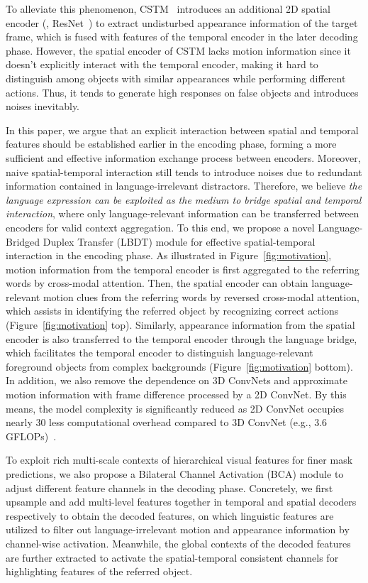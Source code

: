 \documentclass[10pt,twocolumn,letterpaper]{article}
\begin{document}
To alleviate this phenomenon, CSTM~\cite{HuiH0DLWH021} introduces an additional 2D spatial encoder (\eg, ResNet~\cite{He2016CVPR}) to extract undisturbed appearance information of the target frame, which is fused with features of the temporal encoder in the later decoding phase.
However, the spatial encoder of CSTM lacks motion information since it doesn't explicitly interact with the temporal encoder, making it hard to distinguish among objects with similar appearances while performing different actions.
Thus, it tends to generate high responses on false objects and introduces noises inevitably.

In this paper, we argue that an explicit interaction between spatial and temporal features should be established earlier in the encoding phase, forming a more sufficient and effective information exchange process between encoders. 
Moreover, naive spatial-temporal interaction still tends to introduce noises due to redundant information contained in language-irrelevant distractors. 
Therefore, we believe \textit{the language expression can be exploited as the medium to bridge spatial and temporal interaction}, where only language-relevant information can be transferred between encoders for valid context aggregation.
To this end, we propose a novel Language-Bridged Duplex Transfer (LBDT) module for effective spatial-temporal interaction in the encoding phase.
As illustrated in Figure~\ref{fig:motivation}, motion information from the temporal encoder is first aggregated to the referring words by cross-modal attention.
Then, the spatial encoder can obtain language-relevant motion clues from the referring words by reversed cross-modal attention, which assists in identifying the referred object by recognizing correct actions (Figure~\ref{fig:motivation} top).
Similarly, appearance information from the spatial encoder is also transferred to the temporal encoder through the language bridge, which facilitates the temporal encoder to distinguish language-relevant foreground objects from complex backgrounds (Figure~\ref{fig:motivation} bottom).
In addition, we also remove the dependence on 3D ConvNets and approximate motion information with frame difference processed by a 2D ConvNet.
By this means, the model complexity is significantly reduced as 2D ConvNet occupies nearly 30 less computational overhead compared to 3D ConvNet (e.g., 3.6  GFLOPs)~\cite{chen2018multi}.

To exploit rich multi-scale contexts of hierarchical visual features for finer mask predictions, we also propose a Bilateral Channel Activation (BCA) module to adjust different feature channels in the decoding phase. Concretely, we first upsample and add multi-level features together in temporal and spatial decoders respectively to obtain the decoded features, on which linguistic features are utilized to filter out language-irrelevant motion and appearance information by channel-wise activation. Meanwhile, the global contexts of the decoded features are further extracted to activate the spatial-temporal consistent channels for highlighting features of the referred object.
\end{document}

